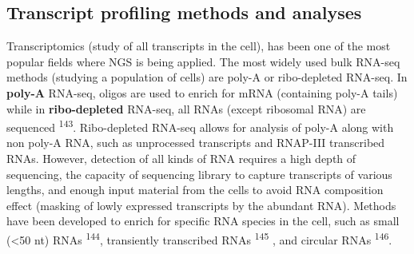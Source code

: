 \documentclass[11pt,twoside]{MPIthesis}
\theoremstyle{definition}
\theoremstyle{definition}
\theoremstyle{definition}
\theoremstyle{remark}
\begin{document}
\subsection{Transcript profiling methods and
analyses}\label{transcript-profiling-methods-and-analyses}

Transcriptomics (study of all transcripts in the cell), has been one of
the most popular fields where NGS is being applied. The most widely used
bulk RNA-seq methods (studying a population of cells) are poly-A or
ribo-depleted RNA-seq. In \textbf{poly-A} RNA-seq, oligos are used to
enrich for mRNA (containing poly-A tails) while in
\textbf{ribo-depleted} RNA-seq, all RNAs (except ribosomal RNA) are
sequenced \textsuperscript{143}. Ribo-depleted RNA-seq allows for
analysis of poly-A along with non poly-A RNA, such as unprocessed
transcripts and RNAP-III transcribed RNAs. However, detection of all
kinds of RNA requires a high depth of sequencing, the capacity of
sequencing library to capture transcripts of various lengths, and enough
input material from the cells to avoid RNA composition effect (masking
of lowly expressed transcripts by the abundant RNA). Methods have been
developed to enrich for specific RNA species in the cell, such as small
(\textless{}50 nt) RNAs \textsuperscript{144}, transiently transcribed
RNAs \textsuperscript{145} , and circular RNAs \textsuperscript{146}.
\end{document}
